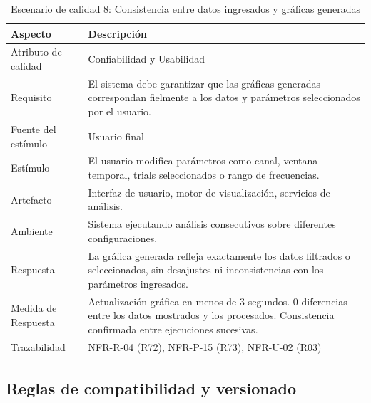 \documentclass[11pt,a4paper]{article}
\DeclareRobustCommand{\_}{\textunderscore\allowbreak}
\begin{document}
\begin{table}[H]
\centering
\caption{Escenario de calidad 8: Consistencia entre datos ingresados y gráficas generadas}
\label{tab:escenario8}
\begin{tabularx}{\textwidth}{|l|X|}
\hline
\textbf{Aspecto} & \textbf{Descripción} \\
\hline
Atributo de calidad & Confiabilidad y Usabilidad \\
\hline
Requisito & El sistema debe garantizar que las gráficas generadas correspondan fielmente a los datos y parámetros seleccionados por el usuario. \\
\hline
Fuente del estímulo & Usuario final \\
\hline
Estímulo & El usuario modifica parámetros como canal, ventana temporal, trials seleccionados o rango de frecuencias. \\
\hline
Artefacto & Interfaz de usuario, motor de visualización, servicios de análisis. \\
\hline
Ambiente & Sistema ejecutando análisis consecutivos sobre diferentes configuraciones. \\
\hline
Respuesta & La gráfica generada refleja exactamente los datos filtrados o seleccionados, sin desajustes ni inconsistencias con los parámetros ingresados. \\
\hline
Medida de Respuesta & Actualización gráfica en menos de 3 segundos. 0 diferencias entre los datos mostrados y los procesados. Consistencia confirmada entre ejecuciones sucesivas. \\
\hline
Trazabilidad & NFR-R-04 (R72), NFR-P-15 (R73), NFR-U-02 (R03) \\
\hline
\end{tabularx}
\end{table}




\subsection{Reglas de compatibilidad y versionado}
\end{document}
